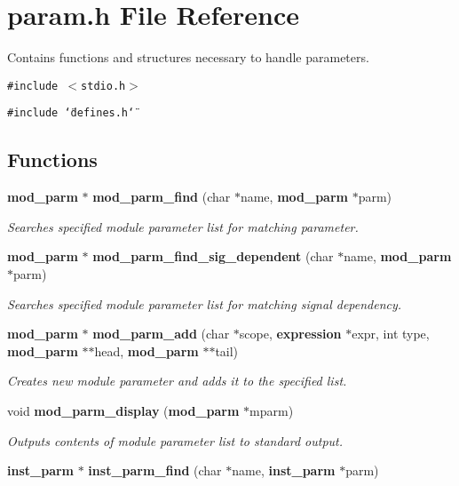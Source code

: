 \section{param.h File Reference}
\label{param_8h}
Contains functions and structures necessary to handle parameters. 


{\tt \#include $<$stdio.h$>$}\par
{\tt \#include \char`\"{}defines.h\char`\"{}}\par
\subsection*{Functions}
\begin{CompactItemize}
\item 
{\bf mod\_\-parm} $\ast$ {\bf mod\_\-parm\_\-find} (char $\ast$name, {\bf mod\_\-parm} $\ast$parm)
\begin{CompactList}\small\item\em Searches specified module parameter list for matching parameter.\item\end{CompactList}\item 
{\bf mod\_\-parm} $\ast$ {\bf mod\_\-parm\_\-find\_\-sig\_\-dependent} (char $\ast$name, {\bf mod\_\-parm} $\ast$parm)
\begin{CompactList}\small\item\em Searches specified module parameter list for matching signal dependency.\item\end{CompactList}\item 
{\bf mod\_\-parm} $\ast$ {\bf mod\_\-parm\_\-add} (char $\ast$scope, {\bf expression} $\ast$expr, int type, {\bf mod\_\-parm} $\ast$$\ast$head, {\bf mod\_\-parm} $\ast$$\ast$tail)
\begin{CompactList}\small\item\em Creates new module parameter and adds it to the specified list.\item\end{CompactList}\item 
void {\bf mod\_\-parm\_\-display} ({\bf mod\_\-parm} $\ast$mparm)
\begin{CompactList}\small\item\em Outputs contents of module parameter list to standard output.\item\end{CompactList}\item 
{\bf inst\_\-parm} $\ast$ {\bf inst\_\-parm\_\-find} (char $\ast$name, {\bf inst\_\-parm} $\ast$parm)

\end{CompactItemize}
